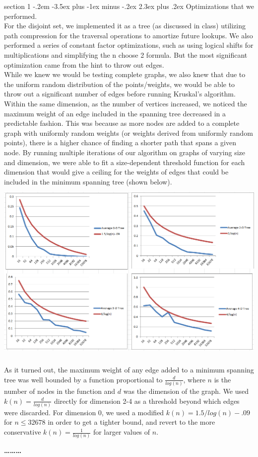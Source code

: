 \documentclass[12pt]{article}
\makeatletter
\newenvironment{problem}{\@startsection
       {section}
       {1}
       {-.2em}
       {-3.5ex plus -1ex minus -.2ex}
       {2.3ex plus .2ex}
       {\pagebreak[3]%
       \large\bf\noindent{Problem }
       }
       }
       {%
       \begin{center}\large\bf \ldots\ldots\ldots\end{center}}
\makeatother
\begin{document}
\begin{problem}{}
Optimizations that we performed.\\

\noindent For the disjoint set, we implemented it as a tree (as
discussed in class) utilizing path compression for the traversal
operations to amortize future lookups. We also performed a series of
constant factor optimizations, such as using logical shifts for
multiplications and simplifying the n choose 2 formula. But the most
significant optimization came from the hint to throw out edges.\\

\noindent While we knew we would be testing complete graphs, we also knew that due to the uniform random distribution of the points/weights, we would be able to throw out a significant number of edges before running Kruskal's algorithm.  Within the same dimension, as the number of vertices increased, we noticed the maximum weight of an edge included in the spanning tree decreased in a predictable fashion.  This was because as more nodes are added to a complete graph with uniformly random weights (or weights derived from uniformly random points), there is a higher chance of finding a shorter path that spans a given node.  By running multiple iterations of our algorithm on graphs of varying size and dimension, we were able to fit a size-dependent threshold function for each dimension that would give a ceiling for the weights of edges that could be included in the minimum spanning tree (shown below).\\

\includegraphics[height=90mm]{threshold.png}

\noindent As it turned out, the maximum weight of any edge added to a
minimum spanning tree was well bounded by a function proportional to
$\frac{d}{log(n)}$, where $n$ is the number of nodes in the function
and $d$ was the dimension of the graph. We used
$k(n)=\frac{d}{log(n)}$ directly for dimension 2-4 as a threshold
beyond which edges were discarded. For dimension 0, we used a modified
$k(n) = 1.5/log(n)-.09$ for $n \leq 32678$ in order to get a tighter
bound, and revert to the more conservative $k(n)=\frac{1}{log(n)}$ for
larger values of $n$.\\


\end{problem}
\end{document}
